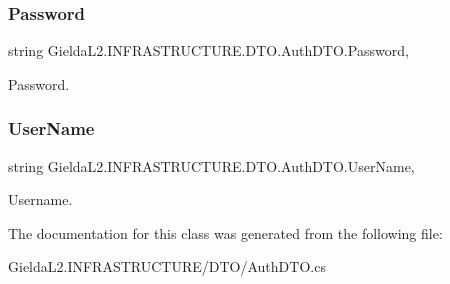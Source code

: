 \subsubsection{\texorpdfstring{Password}{Password}}
{\footnotesize\ttfamily string Gielda\+L2.\+I\+N\+F\+R\+A\+S\+T\+R\+U\+C\+T\+U\+R\+E.\+D\+T\+O.\+Auth\+D\+T\+O.\+Password\hspace{0.3cm}{\ttfamily [get]}, {\ttfamily [set]}}



Password. 

\mbox{\label{class_gielda_l2_1_1_i_n_f_r_a_s_t_r_u_c_t_u_r_e_1_1_d_t_o_1_1_auth_d_t_o_a34aca8e8a62a54635e0241833523a94a}} 
\subsubsection{\texorpdfstring{UserName}{UserName}}
{\footnotesize\ttfamily string Gielda\+L2.\+I\+N\+F\+R\+A\+S\+T\+R\+U\+C\+T\+U\+R\+E.\+D\+T\+O.\+Auth\+D\+T\+O.\+User\+Name\hspace{0.3cm}{\ttfamily [get]}, {\ttfamily [set]}}



Username. 



The documentation for this class was generated from the following file\+:\begin{DoxyCompactItemize}
\item 
Gielda\+L2.\+I\+N\+F\+R\+A\+S\+T\+R\+U\+C\+T\+U\+R\+E/\+D\+T\+O/Auth\+D\+T\+O.\+cs\end{DoxyCompactItemize}
